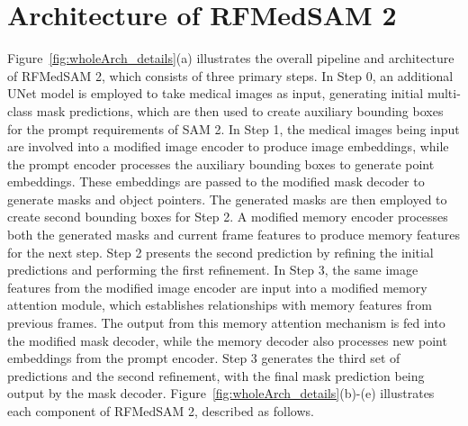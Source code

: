 \section{Architecture of RFMedSAM 2}
Figure~\ref{fig:wholeArch_details}(a) illustrates the overall pipeline and architecture of RFMedSAM 2, which consists of three primary steps. In Step 0, an additional UNet model is employed to take medical images as input, generating initial multi-class mask predictions, which are then used to create auxiliary bounding boxes for the prompt requirements of SAM 2.
In Step 1, the medical images being input are involved into a modified image encoder to produce image embeddings, while the prompt encoder processes the auxiliary bounding boxes to generate point embeddings. These embeddings are passed to the modified mask decoder to generate masks and object pointers. The generated masks are then employed to create second bounding boxes for Step 2. A modified memory encoder processes both the generated masks and current frame features to produce memory features for the next step. Step 2 presents the second prediction by refining the initial predictions and performing the first refinement.
In Step 3, the same image features from the modified image encoder are input into a modified memory attention module, which establishes relationships with memory features from previous frames. The output from this memory attention mechanism is fed into the modified mask decoder, while the memory decoder also processes new point embeddings from the prompt encoder. Step 3 generates the third set of predictions and the second refinement, with the final mask prediction being output by the mask decoder.  
Figure~\ref{fig:wholeArch_details}(b)-(e) illustrates each component of RFMedSAM 2, described as follows. 

